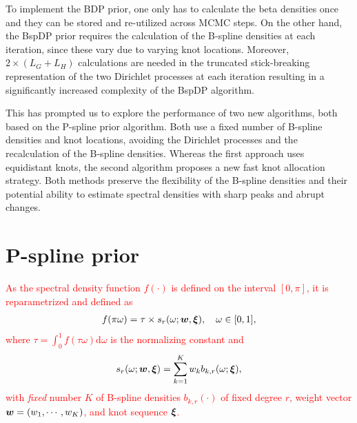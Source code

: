 \documentclass[twocolumn,final]{svjour3}
\newcommand{\bm}[1]{\mbox{\boldmath $#1$}}
\begin{document}
To implement the BDP prior, one only has to  calculate the beta densities once and they can be stored and re-utilized across MCMC steps.  On the other hand, the BspDP prior requires the calculation of the B-spline densities at each iteration, since these vary due to varying knot locations.  Moreover,  $2\!\times\!(L_G + L_H)$ calculations are needed in the truncated stick-breaking representation of the two Dirichlet processes  at each iteration %
resulting in a significantly increased complexity of  the  BspDP algorithm.


This has prompted us to explore the performance of two new algorithms, both based on the P-spline prior algorithm. Both use a fixed number of B-spline densities and knot locations, avoiding the Dirichlet processes and the recalculation of the B-spline densities. Whereas the first approach uses  equidistant knots, the second algorithm  proposes a new fast knot allocation strategy. Both methods preserve the flexibility of the B-spline densities and their potential ability to estimate spectral densities with sharp peaks and abrupt changes.


\section{P-spline prior}
\textcolor{red}{
As the spectral density function $f(\cdot)$ is defined on the interval $[0,\pi]$, it is reparametrized and defined as
\begin{align*}
f(\pi \omega) =\tau \times s_r(\omega;\bm{w}, \bm{\xi}), \quad \omega \in [0,1], %
\end{align*}
where $\tau = \int_{0}^{1}f(\tau \omega)\text{d}\omega$ is the normalizing constant and
\begin{align}
s_r(\omega; \bm{w}, \bm{\xi}) = \sum_{k=1}^{K} w_k b_{k,r}(\omega;\bm{\xi}),
\label{eq:ps_prior}	
\end{align}
with  {\em fixed} number $K$ of B-spline densities  $b_{k,r}(\cdot)$ of fixed degree $r$, weight vector $\bm{w}=(w_1,\cdots, w_K)$, and knot sequence $\bm{\xi}$.}

\end{document}
